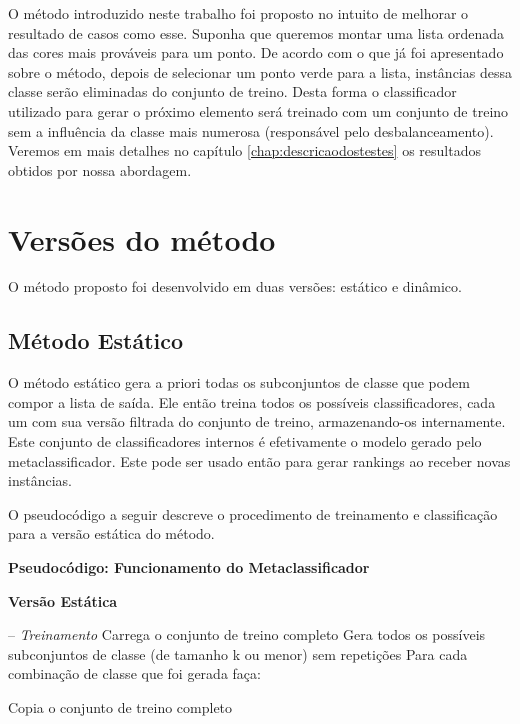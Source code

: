 O método introduzido neste trabalho foi proposto no intuito de melhorar o resultado de casos como esse.
Suponha que queremos montar uma lista ordenada das cores mais prováveis para um ponto.
De acordo com o que já foi apresentado sobre o método, depois de selecionar um ponto verde para a lista, instâncias dessa classe serão eliminadas do conjunto de treino.
Desta forma o classificador utilizado para gerar o próximo elemento será treinado com um conjunto de treino sem a influência da classe mais numerosa (responsável pelo desbalanceamento).
Veremos em mais detalhes no capítulo \ref{chap:descricaodostestes} os resultados obtidos por nossa abordagem.

\section{Versões do método}
\label{sec:versoesdometodo}

O método proposto foi desenvolvido em duas versões: estático e dinâmico.


\subsection{Método Estático}

O método estático gera a priori todas os subconjuntos de classe que podem compor a lista de saída. 
Ele então treina todos os possíveis classificadores, cada um com sua versão filtrada do conjunto de treino, armazenando-os internamente.
Este conjunto de classificadores internos é efetivamente o modelo gerado pelo metaclassificador. 
Este pode ser usado então para gerar rankings ao receber novas instâncias. 

O pseudocódigo a seguir descreve o procedimento de treinamento e classificação para a versão estática do método.
\\

\hline
\begin{center}
\textbf{Pseudocódigo: Funcionamento do Metaclassificador}

\textbf{Versão Estática}
\end{center}
\hline
\hfill \break
-- \textit{Treinamento}\newline
Carrega o conjunto de treino completo\newline
Gera todos os possíveis subconjuntos de classe (de tamanho k ou menor) sem repetições\newline
Para cada combinação de classe que foi gerada faça:

\quad Copia o conjunto de treino completo

